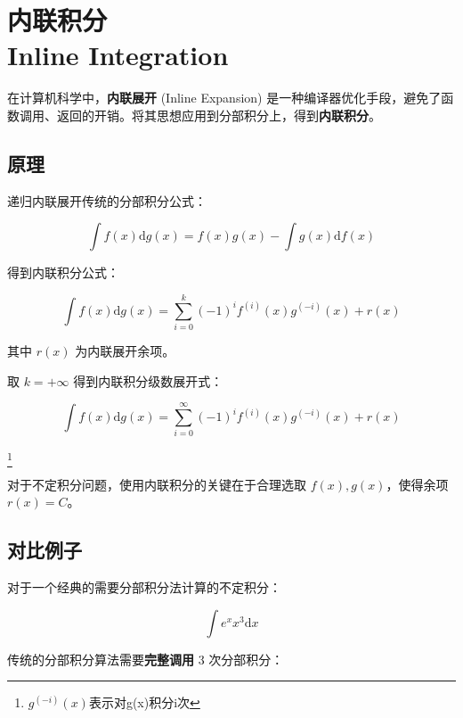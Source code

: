 \chapter[内联积分]{内联积分 \\ Inline Integration}

在计算机科学中，\textbf{内联展开} (Inline Expansion) 是一种编译器优化手段，避免了函数调用、返回的开销。将其思想应用到分部积分上，得到\textbf{内联积分}。

\section{原理}
递归内联展开传统的分部积分公式：

\begin{equation}
    \int {f(x) \mathrm{d} g(x)} = f(x) g(x) - \int {g(x) \mathrm{d} f(x)}
\end{equation}

得到内联积分公式：

\begin{equation}
    \int {f(x) \mathrm{d} g(x)} = \sum_{i = 0}^{k}{(-1)^{i} f^{(i)}(x) g^{(-i)}(x)} + r(x)
\end{equation}

其中 $r(x)$ 为内联展开余项。

取 $k = +\infty$ 得到内联积分级数展开式：

\begin{equation}
    \int {f(x) \mathrm{d} g(x)} = \sum_{i = 0}^{\infty}{(-1)^{i} f^{(i)}(x) g^{(-i)}(x)} + r(x)
\end{equation}

\footnote { $g^{(-i)}(x)$表示对g(x)积分i次 }

对于不定积分问题，使用内联积分的关键在于合理选取 $f(x), g(x)$，使得余项 $r(x) = C$。


\section{对比例子}

对于一个经典的需要分部积分法计算的不定积分：

$$
\int {e^x x^3 \mathrm{d}x}
$$

传统的分部积分算法需要\textbf{完整调用} 3 次分部积分：


